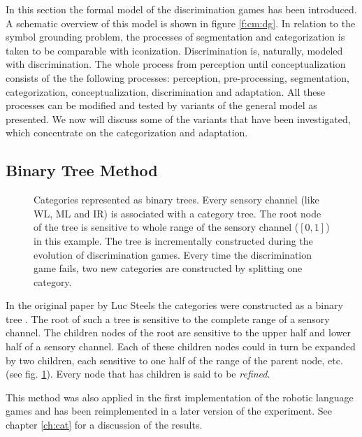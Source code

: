 \p
In this section the formal model of the discrimination games has been introduced. A schematic overview of this model is shown in figure \ref{f:cm:dg}. In relation to the symbol grounding problem, the processes of segmentation and categorization is taken to be comparable with iconization. Discrimination is, naturally, modeled with discrimination. The whole process from perception until conceptualization consists of the the following processes: perception, pre-processing, segmentation, categorization, conceptualization, discrimination and adaptation. All these processes can be modified and tested by variants of the general model as presented. We now will discuss some of the variants that have been investigated, which concentrate on the categorization and adaptation.

\subsection{Binary Tree Method}\label{s:cm:binary}

\begin{figure}
\centerline{}
\caption{Categories represented as binary trees. Every sensory channel (like WL, ML and IR) is associated with a category tree. The root node of the tree is sensitive to whole range of the sensory channel ($[0,1]$) in this example. The tree is incrementally constructed during the evolution of discrimination games. Every time the discrimination game fails, two new categories are constructed by splitting one category.}
\label{f:cm:binary_tree}
\end{figure}

In the original paper by Luc Steels the categories were constructed as a binary tree \cite{steels:1996b}. The root of such a tree is sensitive to the complete range of a sensory channel. The children nodes of the root are sensitive to the upper half and lower half of a sensory channel. Each of these children nodes could in turn be expanded by two children, each sensitive to one half of the range of the parent node, etc. (see fig. \ref{f:cm:binary_tree}). Every node that has children is said to be {\em refined}.

This method was also applied in the first implementation of the robotic language games \cite{steelsvogt:1997,vogt:1998a} and has been reimplemented in a later version of the experiment. See chapter \ref{ch:cat} for a discussion of the results.

